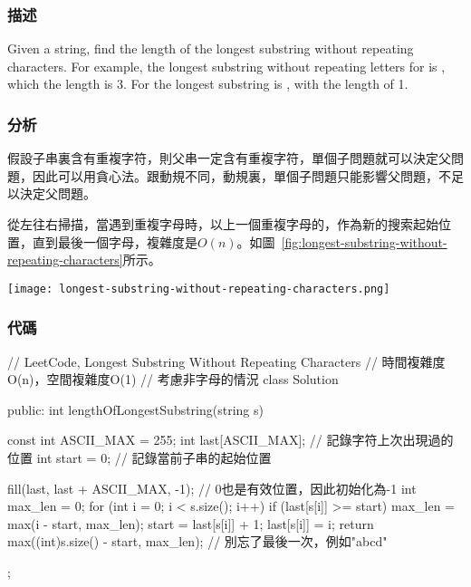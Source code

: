 \subsubsection{描述}
Given a string, find the length of the longest substring without repeating characters. For example, the longest substring without repeating letters for  is , which the length is 3. For  the longest substring is , with the length of 1.


\subsubsection{分析}
假設子串裏含有重複字符，則父串一定含有重複字符，單個子問題就可以決定父問題，因此可以用貪心法。跟動規不同，動規裏，單個子問題只能影響父問題，不足以決定父問題。

從左往右掃描，當遇到重複字母時，以上一個重複字母的，作為新的搜索起始位置，直到最後一個字母，複雜度是$O(n)$。如圖~\ref{fig:longest-substring-without-repeating-characters}所示。

\begin{center}
\texttt{[image: longest-substring-without-repeating-characters.png]}\\
\label{fig:longest-substring-without-repeating-characters}
\end{center}


\subsubsection{代碼}
\begin{Code}
// LeetCode, Longest Substring Without Repeating Characters
// 時間複雜度O(n)，空間複雜度O(1)
// 考慮非字母的情況
class Solution {
public:
    int lengthOfLongestSubstring(string s) {
        const int ASCII_MAX = 255;
        int last[ASCII_MAX]; // 記錄字符上次出現過的位置
        int start = 0; // 記錄當前子串的起始位置

        fill(last, last + ASCII_MAX, -1); // 0也是有效位置，因此初始化為-1
        int max_len = 0;
        for (int i = 0; i < s.size(); i++) {
            if (last[s[i]] >= start) {
                max_len = max(i - start, max_len);
                start = last[s[i]] + 1;
            }
            last[s[i]] = i;
        }
        return max((int)s.size() - start, max_len);  // 別忘了最後一次，例如"abcd"
    }
};
\end{Code}


